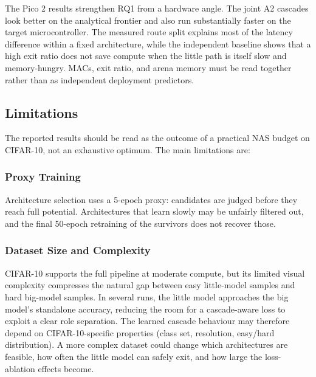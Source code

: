 \documentclass[conference]{IEEEtran}
\begin{document}
The Pico 2 results strengthen RQ1 from a hardware angle. The joint A2
cascades look better on the analytical frontier and also run substantially
faster on the target microcontroller. The measured route split explains
most of the latency difference within a fixed architecture, while the
independent baseline shows that a high exit ratio does not save compute
when the little path is itself slow and memory-hungry. MACs, exit ratio,
and arena memory must be read together rather than as independent
deployment predictors.

\subsection{Limitations}

The reported results should be read as the outcome of a practical NAS
budget on CIFAR-10, not an exhaustive optimum. The main limitations are:

\subsubsection{Proxy Training}
Architecture selection uses a 5-epoch proxy: candidates are judged before
they reach full potential. Architectures that learn slowly may be unfairly
filtered out, and the final 50-epoch retraining of the survivors does not
recover those.

\subsubsection{Dataset Size and Complexity}
CIFAR-10 supports the full pipeline at moderate compute, but its limited
visual complexity compresses the natural gap between easy little-model
samples and hard big-model samples. In several runs, the little model
approaches the big model's standalone accuracy, reducing the room for a
cascade-aware loss to exploit a clear role separation. The learned cascade
behaviour may therefore depend on CIFAR-10-specific properties (class set,
resolution, easy/hard distribution). A more complex dataset could change
which architectures are feasible, how often the little model can safely
exit, and how large the loss-ablation effects become.
\end{document}

